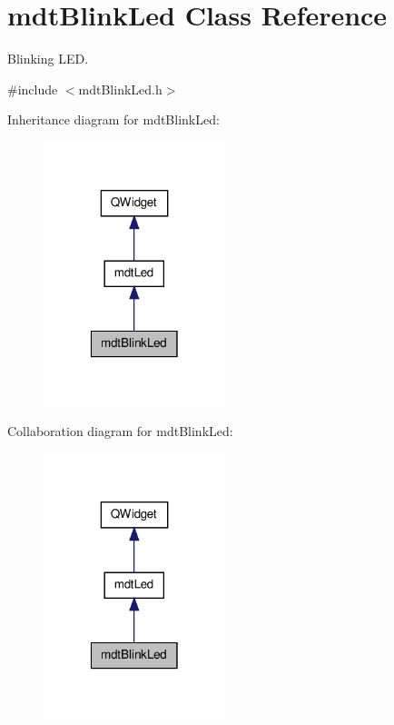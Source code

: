 \hypertarget{classmdt_blink_led}{\section{mdt\-Blink\-Led Class Reference}
\label{classmdt_blink_led}
}


Blinking L\-E\-D.  




{\ttfamily \#include $<$mdt\-Blink\-Led.\-h$>$}



Inheritance diagram for mdt\-Blink\-Led\-:
\nopagebreak
\begin{figure}[H]
\begin{center}
\leavevmode
\includegraphics[width=150pt]{classmdt_blink_led__inherit__graph}
\end{center}
\end{figure}


Collaboration diagram for mdt\-Blink\-Led\-:
\nopagebreak
\begin{figure}[H]
\begin{center}
\leavevmode
\includegraphics[width=150pt]{classmdt_blink_led__coll__graph}
\end{center}
\end{figure}
